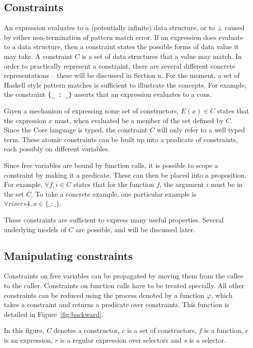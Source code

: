\documentclass[preprint]{sigplanconf}
\newcommand{\T}[1]{\texttt{#1}}
\newcommand{\g}[1]{\{#1\}} %
\begin{document}
\subsection{Constraints}

An expression evaluates to a (potentially infinite) data structure, or to $\bot{}$ caused by either non-termination of pattern match error. If an expression does evaluate to a data structure, then a constraint states the possible forms of data value it may take. A constraint $C$ is a set of data structures that a value may match. In order to practically represent a constraint, there are several different concrete representations -- these will be discussed in Section n. For the moment, a set of Haskell style pattern matches is sufficient to illustrate the concepts. For example, the constraint \T{\g{\_ : \_}} asserts that an expression evaluates to a cons.

Given a mechanism of expressing some set of constructors, $E(x) \in C$ states that the expression $x$ must, when evaluated be a member of the set defined by $C$. Since the Core language is typed, the constraint $C$ will only refer to a well typed term. These atomic constraints can be built up into a predicate of constraints, each possibly on different variables.

Since free variables are bound by function calls, it is possible to scope a constraint by making it a predicate. These can then be placed into a proposition. For example, $\forall f, i \in C$ states that for the function $f$, the argument $i$ must be in the set $C$. To take a concrete example, one particular example is $\forall risers4, x \in \g{\_ : \_}$.

These constraints are sufficient to express many useful properties. Several underlying models of $C$ are possible, and will be discussed later.

\subsection{Manipulating constraints}

Constraints on free variables can be propagated by moving them from the callee to the caller. Constraints on function calls have to be treated specially. All other constraints can be reduced using the process denoted by a function $\varphi$, which takes a constraint and returns a predicate over constraints. This function is detailed in Figure~\ref{fig:backward}.

In this figure, $C$ denotes a constructor, $c$ is a set of
constructors, $f$ is a function, $e$ is an expression, $r$ is a
regular expression over selectors and $s$ is a selector.
\end{document}

